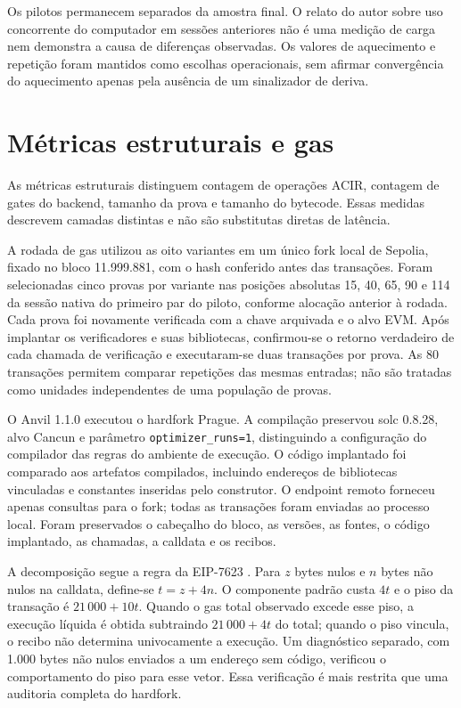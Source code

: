 Os pilotos permanecem separados da amostra final. O relato do autor sobre uso concorrente do computador em sessões anteriores não é uma medição de carga nem demonstra a causa de diferenças observadas. Os valores de aquecimento e repetição foram mantidos como escolhas operacionais, sem afirmar convergência do aquecimento apenas pela ausência de um sinalizador de deriva.

\section{Métricas estruturais e gas}

As métricas estruturais distinguem contagem de operações ACIR, contagem de gates do backend, tamanho da prova e tamanho do bytecode. Essas medidas descrevem camadas distintas e não são substitutas diretas de latência.

A rodada de gas utilizou as oito variantes em um único fork local de Sepolia, fixado no bloco 11.999.881, com o hash conferido antes das transações. Foram selecionadas cinco provas por variante nas posições absolutas 15, 40, 65, 90 e 114 da sessão nativa do primeiro par do piloto, conforme alocação anterior à rodada. Cada prova foi novamente verificada com a chave arquivada e o alvo EVM. Após implantar os verificadores e suas bibliotecas, confirmou-se o retorno verdadeiro de cada chamada de verificação e executaram-se duas transações por prova. As 80 transações permitem comparar repetições das mesmas entradas; não são tratadas como unidades independentes de uma população de provas.

O Anvil 1.1.0 executou o hardfork Prague. A compilação preservou solc 0.8.28, alvo Cancun e parâmetro \texttt{optimizer\_runs=1}, distinguindo a configuração do compilador das regras do ambiente de execução. O código implantado foi comparado aos artefatos compilados, incluindo endereços de bibliotecas vinculadas e constantes inseridas pelo construtor. O endpoint remoto forneceu apenas consultas para o fork; todas as transações foram enviadas ao processo local. Foram preservados o cabeçalho do bloco, as versões, as fontes, o código implantado, as chamadas, a calldata e os recibos.

A decomposição segue a regra da EIP-7623 \cite{eip7623}. Para $z$ bytes nulos e $n$ bytes não nulos na calldata, define-se $t=z+4n$. O componente padrão custa $4t$ e o piso da transação é $21\,000+10t$. Quando o gas total observado excede esse piso, a execução líquida é obtida subtraindo $21\,000+4t$ do total; quando o piso vincula, o recibo não determina univocamente a execução. Um diagnóstico separado, com 1.000 bytes não nulos enviados a um endereço sem código, verificou o comportamento do piso para esse vetor. Essa verificação é mais restrita que uma auditoria completa do hardfork.

